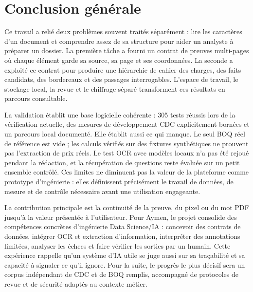 \chapter*{Conclusion générale}
Ce travail a relié deux problèmes souvent traités séparément : lire les caractères d'un document et comprendre assez de sa structure pour aider un analyste à préparer un dossier. La première tâche a fourni un contrat de preuves multi-pages où chaque élément garde sa source, sa page et ses coordonnées. La seconde a exploité ce contrat pour produire une hiérarchie de cahier des charges, des faits candidats, des bordereaux et des passages interrogables. L'espace de travail, le stockage local, la revue et le chiffrage séparé transforment ces résultats en parcours consultable.

La validation établit une base logicielle cohérente : 305 tests réussis lors de la vérification actuelle, des mesures de développement CDC explicitement bornées et un parcours local documenté. Elle établit aussi ce qui manque. Le seul BOQ réel de référence est vide ; les calculs vérifiés sur des fixtures synthétiques ne prouvent pas l'extraction de prix réels. Le test OCR avec modèles locaux n'a pas été rejoué pendant la rédaction, et la récupération de questions reste évaluée sur un petit ensemble contrôlé. Ces limites ne diminuent pas la valeur de la plateforme comme prototype d'ingénierie : elles définissent précisément le travail de données, de mesure et de contrôle nécessaire avant une utilisation engageante.

La contribution principale est la continuité de la preuve, du pixel ou du mot PDF jusqu'à la valeur présentée à l'utilisateur. Pour Aymen, le projet consolide des compétences concrètes d'ingénierie Data Science/IA : concevoir des contrats de données, intégrer OCR et extraction d'information, interpréter des annotations limitées, analyser les échecs et faire vérifier les sorties par un humain. Cette expérience rappelle qu'un système d'IA utile se juge aussi sur sa traçabilité et sa capacité à signaler ce qu'il ignore. Pour la suite, le progrès le plus décisif sera un corpus indépendant de CDC et de BOQ remplis, accompagné de protocoles de revue et de sécurité adaptés au contexte métier.

